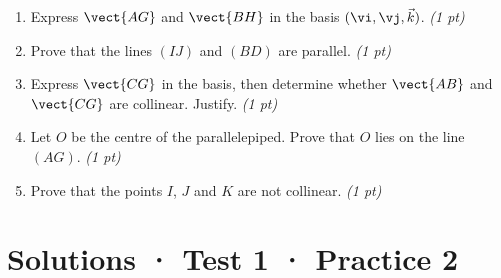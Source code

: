 \begin{enumerate}

\item Express $\vect{AG}$ and $\vect{BH}$ in the basis $(\vi,\vj,\vec k)$. \hfill\textit{(1 pt)}

\item Prove that the lines $(IJ)$ and $(BD)$ are parallel. \hfill\textit{(1 pt)}

\item Express $\vect{CG}$ in the basis, then determine whether $\vect{AB}$ and $\vect{CG}$ are collinear. Justify. \hfill\textit{(1 pt)}

\item Let $O$ be the centre of the parallelepiped. Prove that $O$ lies on the line $(AG)$. \hfill\textit{(1 pt)}

\item Prove that the points $I$, $J$ and $K$ are not collinear. \hfill\textit{(1 pt)}

\end{enumerate}

\ifmxteacher\mxnewpage

\section*{Solutions · Test 1 · Practice 2}\label{cor:1-2}

